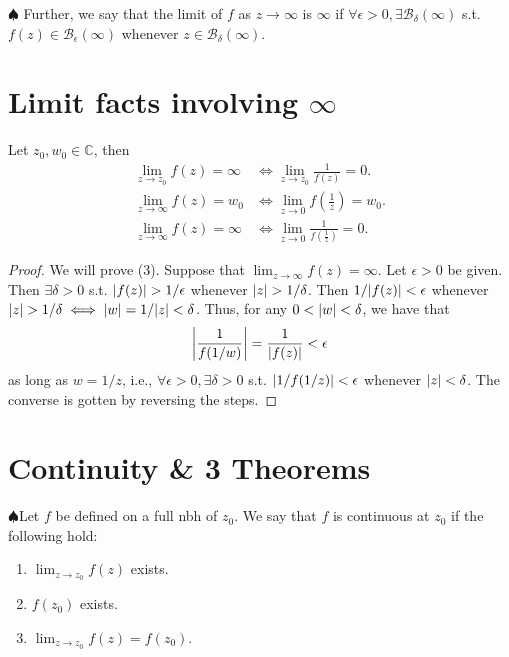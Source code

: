 \documentclass{article}
\theoremstyle{definition}
\newcommand{\f}[2]{\frac{#1}{#2}}
\newcommand{\C}{\mathbb{C}}
\newcommand{\B}{\mathcal{B}}
\newcommand{\lp}{\left(}
\newcommand{\rp}{\right)}
\newcommand{\nn}{\nonumber}
\begin{document}
\noindent $\spadesuit$ Further, we say that the limit of $f$ as $z \to \infty$ is $\infty$ if $\forall \epsilon > 0, \exists \B_\delta(\infty)$ s.t. $f(z) \in \B_\epsilon(\infty)$ whenever $z\in \B_\delta(\infty)$. 


\section{Limit facts involving $\infty$}

Let $z_0, w_0 \in \C$, then 
\begin{align}
\lim_{z \to z_0} f(z) =\infty &\iff \lim_{z \to z_0}\f{1}{f(z)} = 0.\nn\\
\lim_{z\to\infty} f(z) = w_0 &\iff \lim_{z\to 0} f\lp \f{1}{z} \rp = w_0.\nn\\
\lim_{z\to\infty} f(z) = \infty &\iff \lim_{z\to 0} \f{1}{f\lp \f{1}{z}\rp} = 0.
\end{align}


\begin{proof}
	We will prove (3). Suppose that $\lim_{z\to\infty} f(z) = \infty$. Let $\epsilon > 0$ be given. Then $\exists \delta > 0$ s.t. $\abs{f(z)} > 1/\epsilon$ whenever $\abs{z} > 1/\delta$. Then $1/\abs{f(z)} < \epsilon$ whenever $\abs{z} > 1/\delta \iff \abs{w} = 1/\abs{z} < \delta$. Thus, for any $0 < \abs{w} < \delta$, we have that 
	\begin{align}
	\abs{\f{1}{f(1/w)}} = \f{1}{\abs{f(z)}} < \epsilon
	\end{align}
	as long as $w = 1/z$, i.e., $\forall \epsilon> 0, \exists \delta > 0$ s.t. $\abs{1 / f(1/z)} < \epsilon$ whenever $\abs{z} < \delta$. The converse is gotten by reversing the steps. 
\end{proof}



\section{Continuity \& 3 Theorems}

\noindent $\spadesuit$Let $f$ be defined on a full nbh of $z_0$. We say that $f$ is continuous at $z_0$ if the following hold:
\begin{enumerate}
	\item $\lim_{z \to z_0} f(z)$ exists. 
	\item $f(z_0)$ exists. 
	\item $\lim_{z \to z_0} f(z) = f(z_0)$. 
\end{enumerate}
\end{document}
